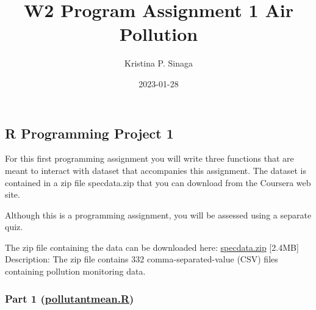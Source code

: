 \documentclass[
]{article}
\title{W2 Program Assignment 1 Air Pollution}
\author{Kristina P. Sinaga}
\date{2023-01-28}
\begin{document}
\maketitle

\hypertarget{r-programming-project-1}{%
\subsection{R Programming Project 1}\label{r-programming-project-1}}

For this first programming assignment you will write three functions
that are meant to interact with dataset that accompanies this
assignment. The dataset is contained in a zip file specdata.zip that you
can download from the Coursera web site.

Although this is a programming assignment, you will be assessed using a
separate quiz.

The zip file containing the data can be downloaded here:
\href{https://d396qusza40orc.cloudfront.net/rprog\%2Fdata\%2Fspecdata.zip}{specdata.zip}
{[}2.4MB{]} Description: The zip file contains 332 comma-separated-value
(CSV) files containing pollution monitoring data.

\hypertarget{part-1-pollutantmean.r}{%
\subsubsection{\texorpdfstring{Part 1
(\href{https://github.com/kpnaga08/datasciencecoursera/blob/master/R\%20Programming/Project\textquotesingle{}\%20Assignment/Projects/pollutantmean.R}{pollutantmean.R})}{Part 1 (pollutantmean.R)}}\label{part-1-pollutantmean.r}}
\end{document}
